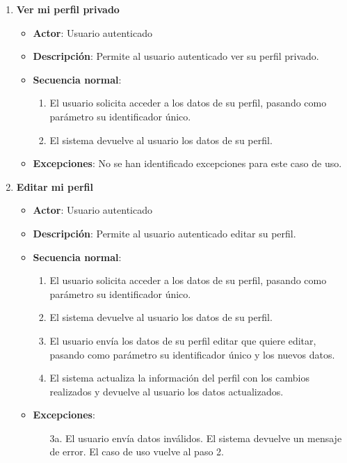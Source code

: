 \begin{enumerate}[label=UC-\protect\twodigits{\arabic*}:, align=left, leftmargin=*]
\item \textbf{Ver mi perfil privado}
\begin{itemize}
\item \textbf{Actor}: Usuario autenticado
\item \textbf{Descripción}: Permite al usuario autenticado ver su perfil privado.
\item \textbf{Secuencia normal}:
\begin{enumerate}[label={\arabic*}:]
\item El usuario solicita acceder a los datos de su perfil, pasando como parámetro su identificador único.
\item El sistema devuelve al usuario los datos de su perfil.
\end{enumerate}
\item \textbf{Excepciones}: No se han identificado excepciones para este caso de uso.
\end{itemize}

\item \textbf{Editar mi perfil}
\begin{itemize}
\item \textbf{Actor}: Usuario autenticado
\item \textbf{Descripción}: Permite al usuario autenticado editar su perfil.
\item \textbf{Secuencia normal}:
\begin{enumerate}[label={\arabic*}:]
\item El usuario solicita acceder a los datos de su perfil, pasando como parámetro su identificador único.
\item El sistema devuelve al usuario los datos de su perfil.
\item El usuario envía los datos de su perfil editar que quiere editar, pasando como parámetro su identificador único y los nuevos datos.
\item El sistema actualiza la información del perfil con los cambios realizados y devuelve al usuario los datos actualizados.
\end{enumerate}
\item \textbf{Excepciones}: 
\begin{itemize}
\item[3a.] El usuario envía datos inválidos. El sistema devuelve un mensaje de error. El caso de uso vuelve al paso 2.
\end{itemize} 
\end{itemize}


\end{enumerate}
